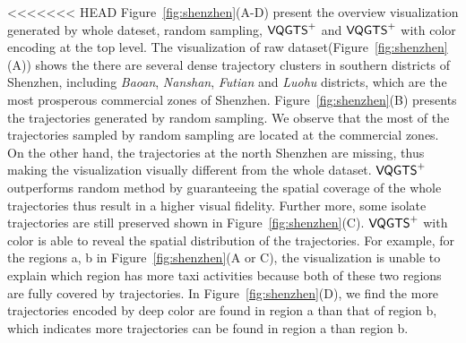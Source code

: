 <<<<<<< HEAD
Figure~\ref{fig:shenzhen}(A-D) present the overview visualization generated by whole dateset, random sampling, $\mathsf{VQGTS}^{+}$ and $\mathsf{VQGTS}^{+}$ with color encoding at the top level. The visualization of raw dataset(Figure~\ref{fig:shenzhen}(A)) shows the there are several dense trajectory clusters in southern districts of Shenzhen, including \textit{Baoan}, \textit{Nanshan}, \textit{Futian} and \textit{Luohu} districts, which are the most prosperous commercial zones of Shenzhen. Figure~\ref{fig:shenzhen}(B) presents the trajectories generated by random sampling. We observe that the most of the trajectories sampled by random sampling are located at the commercial zones. On the other hand, the trajectories at the north Shenzhen are missing, thus making the visualization visually different from the whole dataset.
$\mathsf{VQGTS}^{+}$ outperforms random method by guaranteeing the spatial coverage of the whole trajectories thus result in a higher visual fidelity. Further more, some isolate trajectories are still preserved shown in Figure~\ref{fig:shenzhen}(C). $\mathsf{VQGTS}^{+}$ with color is able to reveal the spatial distribution of the trajectories. For example, for the regions a, b in Figure~\ref{fig:shenzhen}(A or C), the visualization is unable to explain which region has more taxi activities because both of these two regions are fully covered by trajectories. In Figure~\ref{fig:shenzhen}(D), we find the more trajectories encoded by deep color are found in region a than that of region b, which indicates more trajectories can be found in region a than region b. 

